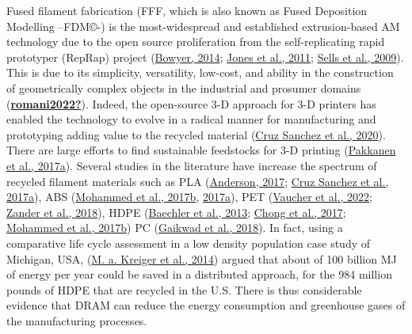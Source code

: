 \documentclass[
  12pt,
  number,
  review]{elsarticle}
\begin{document}
Fused filament fabrication (FFF, which is also known as Fused Deposition
Modelling --FDM©-) is the most-widespread and established
extrusion-based AM technology due to the open source proliferation from
the self-replicating rapid prototyper (RepRap) project
(\protect\hyperlink{ref-bowyer2014}{Bowyer, 2014};
\protect\hyperlink{ref-jones2011}{Jones et al., 2011};
\protect\hyperlink{ref-sells2009}{Sells et al., 2009}). This is due to
its simplicity, versatility, low-cost, and ability in the construction
of geometrically complex objects in the industrial and prosumer domains
(\protect\hyperlink{ref-romani2022}{\textbf{romani2022?}}). Indeed, the
open-source 3-D approach for 3-D printers has enabled the technology to
evolve in a radical manner for manufacturing and prototyping adding
value to the recycled material
(\protect\hyperlink{ref-cruzsanchez2020}{Cruz Sanchez et al., 2020}).
There are large efforts to find sustainable feedstocks for 3-D printing
(\protect\hyperlink{ref-Pakkanen2017}{Pakkanen et al., 2017a}). Several
studies in the literature have increase the spectrum of recycled
filament materials such as PLA
(\protect\hyperlink{ref-anderson2017}{Anderson, 2017};
\protect\hyperlink{ref-cruzsanchez2017}{Cruz Sanchez et al., 2017a}),
ABS (\protect\hyperlink{ref-mohammed2017a}{Mohammed et al., 2017b},
\protect\hyperlink{ref-mohammed2017}{2017a}), PET
(\protect\hyperlink{ref-vaucher2022}{Vaucher et al., 2022};
\protect\hyperlink{ref-zander2018}{Zander et al., 2018}), HDPE
(\protect\hyperlink{ref-baechler2013}{Baechler et al., 2013};
\protect\hyperlink{ref-chong2017}{Chong et al., 2017};
\protect\hyperlink{ref-mohammed2017a}{Mohammed et al., 2017b}) PC
(\protect\hyperlink{ref-gaikwad2018}{Gaikwad et al., 2018}). In fact,
using a comparative life cycle assessment in a low density population
case study of Michigan, USA, (\protect\hyperlink{ref-Kreiger2014}{M. a.
Kreiger et al., 2014}) argued that about of 100 billion MJ of energy per
year could be saved in a distributed approach, for the 984 million
pounds of HDPE that are recycled in the U.S. There is thus considerable
evidence that DRAM can reduce the energy consumption and greenhouse
gases of the manufacturing processes.
\end{document}
